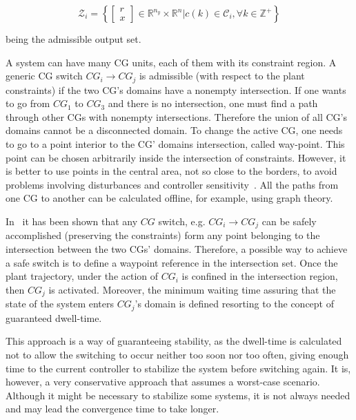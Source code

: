 \begin{equation}
	\mathcal{Z}_i =
	\left\{
	\begin{bmatrix}r\\x\end{bmatrix}
	\in\mathbb{R}^{n_y}\times\mathbb{R}^{n} | c(k)\in\mathcal{C}_i,
	\forall{}k\in\mathbb{Z}^+
	\right\}
\end{equation}

being the admissible output set.

A system can have many CG units, each of them with its constraint region.  A
generic CG switch \(CG_i\rightarrow{}CG_j\) is admissible (with respect to the plant
constraints) if the two CG's domains have a nonempty intersection. If one wants
to go from \(CG_1\) to \(CG_3\) and there is no intersection, one must find a
path through other CGs with nonempty intersections. Therefore the union of all
CG's domains cannot be a disconnected domain. To change the active CG, one needs
to go to a point interior to the CG' domains intersection, called way-point.
This point can be chosen arbitrarily inside the intersection of constraints.
However, it is better to use points in the central area, not so close to the
borders, to avoid problems involving disturbances and controller
sensitivity~\parencite{keel.bhattacharyya:robust}. All the paths from one CG to
another can be calculated offline, for example, using graph
theory\parencite{ahuja.mehlhorn.ea:faster,pettie:new}.

In~\parencite{franzè.lucia.ea:command,lucia.franzè:stabilization} it has been
shown that any \(CG\) switch, e.g.  \(CG_i\rightarrow{}CG_j\) can be safely accomplished
(preserving the constraints) form any point belonging to the intersection
between the two CGs' domains. Therefore, a possible way to achieve a safe switch
is to define a waypoint reference in the intersection set. Once the plant
trajectory, under the action of \(CG_i\) is confined in the intersection region,
then \(CG_j\) is activated. Moreover, the minimum waiting time assuring that the
state of the system enters \(CG_j\)'s domain is defined resorting to the concept
of guaranteed dwell-time.

This approach is a way of guaranteeing stability, as the dwell-time is
calculated not to allow the switching to occur neither too soon nor too often,
giving enough time to the current controller to stabilize the system before
switching again. It is, however, a very conservative approach that assumes a
worst-case scenario. Although it might be necessary to stabilize some systems,
it is not always needed and may lead the convergence time to take longer.

